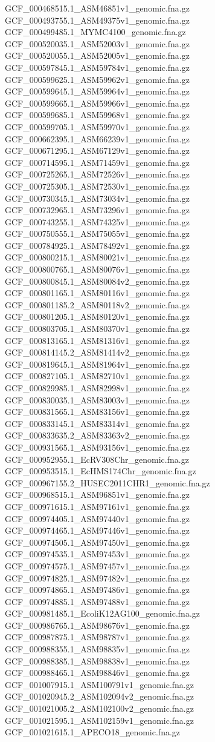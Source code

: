 \documentclass[12pt, letterpaper]{article}
\begin{document}
\begin{verbatim*}
GCF_000468515.1_ASM46851v1_genomic.fna.gz
GCF_000493755.1_ASM49375v1_genomic.fna.gz
GCF_000499485.1_MYMC4100_genomic.fna.gz
GCF_000520035.1_ASM52003v1_genomic.fna.gz
GCF_000520055.1_ASM52005v1_genomic.fna.gz
GCF_000597845.1_ASM59784v1_genomic.fna.gz
GCF_000599625.1_ASM59962v1_genomic.fna.gz
GCF_000599645.1_ASM59964v1_genomic.fna.gz
GCF_000599665.1_ASM59966v1_genomic.fna.gz
GCF_000599685.1_ASM59968v1_genomic.fna.gz
GCF_000599705.1_ASM59970v1_genomic.fna.gz
GCF_000662395.1_ASM66239v1_genomic.fna.gz
GCF_000671295.1_ASM67129v1_genomic.fna.gz
GCF_000714595.1_ASM71459v1_genomic.fna.gz
GCF_000725265.1_ASM72526v1_genomic.fna.gz
GCF_000725305.1_ASM72530v1_genomic.fna.gz
GCF_000730345.1_ASM73034v1_genomic.fna.gz
GCF_000732965.1_ASM73296v1_genomic.fna.gz
GCF_000743255.1_ASM74325v1_genomic.fna.gz
GCF_000750555.1_ASM75055v1_genomic.fna.gz
GCF_000784925.1_ASM78492v1_genomic.fna.gz
GCF_000800215.1_ASM80021v1_genomic.fna.gz
GCF_000800765.1_ASM80076v1_genomic.fna.gz
GCF_000800845.1_ASM80084v2_genomic.fna.gz
GCF_000801165.1_ASM80116v1_genomic.fna.gz
GCF_000801185.2_ASM80118v2_genomic.fna.gz
GCF_000801205.1_ASM80120v1_genomic.fna.gz
GCF_000803705.1_ASM80370v1_genomic.fna.gz
GCF_000813165.1_ASM81316v1_genomic.fna.gz
GCF_000814145.2_ASM81414v2_genomic.fna.gz
GCF_000819645.1_ASM81964v1_genomic.fna.gz
GCF_000827105.1_ASM82710v1_genomic.fna.gz
GCF_000829985.1_ASM82998v1_genomic.fna.gz
GCF_000830035.1_ASM83003v1_genomic.fna.gz
GCF_000831565.1_ASM83156v1_genomic.fna.gz
GCF_000833145.1_ASM83314v1_genomic.fna.gz
GCF_000833635.2_ASM83363v2_genomic.fna.gz
GCF_000931565.1_ASM93156v1_genomic.fna.gz
GCF_000952955.1_EcRV308Chr_genomic.fna.gz
GCF_000953515.1_EcHMS174Chr_genomic.fna.gz
GCF_000967155.2_HUSEC2011CHR1_genomic.fna.gz
GCF_000968515.1_ASM96851v1_genomic.fna.gz
GCF_000971615.1_ASM97161v1_genomic.fna.gz
GCF_000974405.1_ASM97440v1_genomic.fna.gz
GCF_000974465.1_ASM97446v1_genomic.fna.gz
GCF_000974505.1_ASM97450v1_genomic.fna.gz
GCF_000974535.1_ASM97453v1_genomic.fna.gz
GCF_000974575.1_ASM97457v1_genomic.fna.gz
GCF_000974825.1_ASM97482v1_genomic.fna.gz
GCF_000974865.1_ASM97486v1_genomic.fna.gz
GCF_000974885.1_ASM97488v1_genomic.fna.gz
GCF_000981485.1_EcoliK12AG100_genomic.fna.gz
GCF_000986765.1_ASM98676v1_genomic.fna.gz
GCF_000987875.1_ASM98787v1_genomic.fna.gz
GCF_000988355.1_ASM98835v1_genomic.fna.gz
GCF_000988385.1_ASM98838v1_genomic.fna.gz
GCF_000988465.1_ASM98846v1_genomic.fna.gz
GCF_001007915.1_ASM100791v1_genomic.fna.gz
GCF_001020945.2_ASM102094v2_genomic.fna.gz
GCF_001021005.2_ASM102100v2_genomic.fna.gz
GCF_001021595.1_ASM102159v1_genomic.fna.gz
GCF_001021615.1_APECO18_genomic.fna.gz

\end{verbatim*}
\end{document}

